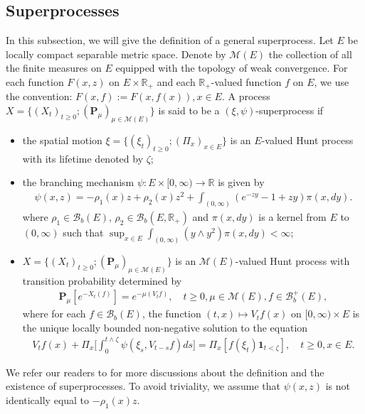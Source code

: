 \documentclass[EJP]{ejpecp} %
\begin{document}
\subsection{Superprocesses}
\label{sec: definition of superprocess}
In this subsection, we will give the definition of a general superprocess.
Let $E$ be locally compact separable metric space. Denote by $\mathcal M(E)$ the collection of all the finite measures on $E$ equipped with the topology of weak convergence.
For each function $F(x,z)$ on $E\times \mathbb R_+$ and each $\mathbb R_+$-valued function $f$ on $E$,
we use the  convention:
$
  F(x,f)
  := F(x,f(x)),
  x\in E.
$
A process $X=\{(X_t)_{t\geq 0}; (\mathbf P_\mu)_{\mu \in \mathcal M(E)}\}$ is said to be a $(\xi,\psi)$-superprocess if
\begin{itemize}
\item
  the spatial motion $\xi=\{(\xi_t)_{t\geq 0};(\Pi_x)_{x\in E}\}$ is an $E$-valued Hunt process with its lifetime denoted by $\zeta$;
\item
  the branching mechanism $\psi: E\times[0,\infty) \to \mathbb R$ is given by
\begin{align}
  \label{eq: branching mechanism}
  \psi(x,z)=
  -\rho_1(x) z + \rho_2 (x) z^2 + \int_{(0,\infty)} (e^{-zy} - 1 + zy) \pi(x,dy).
\end{align}
where $\rho_1 \in \mathcal B_b(E)$, $\rho_2 \in \mathcal B_b(E, \mathbb R_+)$ and $\pi(x,dy)$ is a kernel from $E$ to $(0,\infty)$ such that $\sup_{x\in E} \int_{(0,\infty)} (y\wedge y^2) \pi(x,dy) < \infty$;
\item
  $X=\{(X_t)_{t\geq 0}; (\mathbf P_\mu)_{\mu \in \mathcal M(E)}\}$ is an $\mathcal M(E)$-valued Hunt process with transition probability determined by
  \begin{align}
    \mathbf P_\mu [e^{-X_t(f)}] = e^{-\mu(V_tf)},
    \quad t\geq 0, \mu \in \mathcal M(E), f\in \mathcal B^+_b(E),
  \end{align}
  where for each $f\in \mathcal B_b(E)$, the function $(t,x)\mapsto V_tf(x)$ on $[0,\infty) \times E$ is the unique locally bounded non-negative solution to the equation
  \begin{align}
    \label{eq:FKPP_in_definition}
    V_tf(x) + \Pi_x \Big[  \int_0^{t\wedge \zeta} \psi(\xi_s,V_{t-s}f)ds \Big]
    = \Pi_x [ f(\xi_t)\mathbf 1_{t<\zeta} ],
    \quad t \geq 0, x \in E.
  \end{align}
\end{itemize}
We refer our readers to \cite{Li2011Measure-valued} for more discussions about the definition and the existence of superprocesses.
To avoid triviality, we assume that $\psi(x,z)$ is not identically equal to $-\rho_1(x)z$.
\end{document}
